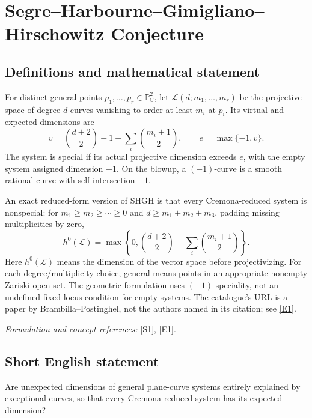 \documentclass[11pt]{article}
\begin{document}
\section*{\texorpdfstring{Segre–Harbourne–Gimigliano–Hirschowitz Conjecture}{Segre–Harbourne–Gimigliano–Hirschowitz Conjecture}}\label{493}
\subsection{Definitions and mathematical statement}
For distinct general points $p_1,\ldots,p_r\in{\mathbb{P}}^2_{{\mathbb{C}}}$, let $\mathcal L(d;m_1,\ldots,m_r)$ be the projective space of degree-$d$ curves vanishing to order at least $m_i$ at $p_i$. Its virtual and expected dimensions are
\[
 v=\binom{d+2}{2}-1-\sum_i\binom{m_i+1}{2},
 \qquad e=\max\{-1,v\}.
\]
The system is special if its actual projective dimension exceeds $e$, with the empty system assigned dimension $-1$. On the blowup, a $(-1)$-curve is a smooth rational curve with self-intersection $-1$.

An exact reduced-form version of SHGH is that every Cremona-reduced system is nonspecial: for $m_1\ge m_2\ge\cdots\ge0$ and $d\ge m_1+m_2+m_3$, padding missing multiplicities by zero,
\[
 h^0(\mathcal L)=\max\left\{0,\binom{d+2}{2}
                                  -\sum_i\binom{m_i+1}{2}\right\}.
\]
Here $h^0(\mathcal L)$ means the dimension of the vector space before projectivizing. For each degree/multiplicity choice, general means points in an appropriate nonempty Zariski-open set. The geometric formulation uses $(-1)$-speciality, not an undefined fixed-locus condition for empty systems. The catalogue's URL is a paper by Brambilla--Postinghel, not the authors named in its citation; see \href{https://link.springer.com/article/10.1007/s40574-025-00468-5}{[E1]}.
\par\smallskip\textit{Formulation and concept references:} \href{https://link.springer.com/article/10.1007/s40574-025-00468-5}{[S1]}, \href{https://link.springer.com/article/10.1007/s40574-025-00468-5}{[E1]}.

\subsection{Short English statement}
Are unexpected dimensions of general plane-curve systems entirely explained by exceptional curves, so that every Cremona-reduced system has its expected dimension?
\end{document}
